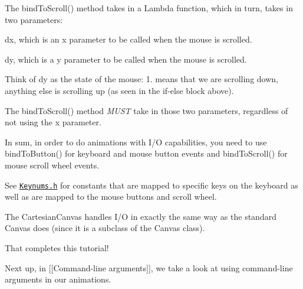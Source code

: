The bind\+To\+Scroll() method takes in a Lambda function, which in turn, takes in two parameters\+:
\begin{DoxyItemize}
\item dx, which is an x parameter to be called when the mouse is scrolled.
\item dy, which is a y parameter to be called when the mouse is scrolled.
\end{DoxyItemize}

Think of dy as the state of the mouse\+: 1. means that we are scrolling down, anything else is scrolling up (as seen in the if-\/else block above).

The bind\+To\+Scroll() method {\itshape M\+U\+S\+T} take in those two parameters, regardless of not using the x parameter.

In sum, in order to do animations with I/\+O capabilities, you need to use bind\+To\+Button() for keyboard and mouse button events and bind\+To\+Scroll() for mouse scroll wheel events.

See \href{http://calvin-cs.github.io/TSGL/html/_keynums_8h_source.html}{\tt Keynums.\+h} for constants that are mapped to specific keys on the keyboard as well as are mapped to the mouse buttons and scroll wheel.

The Cartesian\+Canvas handles I/\+O in exactly the same way as the standard Canvas does (since it is a subclass of the Canvas class).

That completes this tutorial!

Next up, in \mbox{[}\mbox{[}Command-\/line arguments\mbox{]}\mbox{]}, we take a look at using command-\/line arguments in our animations. 